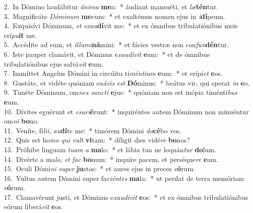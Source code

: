 {2.~}In Dómino laudábitur \textit{á}\textit{ni}\textit{ma} \textbf{me}a:~* áudiant mansuéti, et \textit{læ}\textbf{tén}tur.\\
{3.~}Magnificáte \textit{Dó}\textit{mi}\textit{num} \textbf{me}cum:~* et exaltémus nomen ejus in \textit{i}\textbf{dí}psum.\\
{4.~}Exquisívi Dóminum, \textit{et} \textit{e}\textit{xau}\textbf{dí}vit me:~* et ex ómnibus tribulatiónibus meis erí\textit{pu}\textbf{it} me.\\
{5.~}Accédite ad eum, et \textit{il}\textit{lu}\textit{mi}\textbf{ná}mini:~* et fácies vestræ non con\textit{fun}\textbf{dén}tur.\\
{6.~}Iste pauper clamávit, et Dóminus e\textit{xau}\textit{dí}\textit{vit} \textbf{e}um:~* et de ómnibus tribulatiónibus ejus salvá\textit{vit} \textbf{e}um.\\
{7.~}Immíttet Angelus Dómini in circúitu ti\textit{mén}\textit{ti}\textit{um} \textbf{e}um:~* et erípi\textit{et} \textbf{e}os.\\
{8.~}Gustáte, et vidéte quóniam su\textit{á}\textit{vis} \textit{est} \textbf{Dó}minus:~* beátus vir, qui sperat \textit{in} \textbf{e}o.\\
{9.~}Timéte Dóminum, om\textit{nes} \textit{san}\textit{cti} \textbf{e}jus:~* quóniam non est inópia timénti\textit{bus} \textbf{e}um.\\
{10.~}Dívites eguérunt et \textit{e}\textit{su}\textit{ri}\textbf{é}runt:~* inquiréntes autem Dóminum non minuéntur om\textit{ni} \textbf{bo}no.\\
{11.~}Veníte, fí\textit{li}\textit{i}, \textit{au}\textbf{dí}te me:~* timórem Dómini \textit{do}\textbf{cé}bo vos.\\
{12.~}Quis est ho\textit{mo} \textit{qui} \textit{vult} \textbf{vi}tam:~* díligit dies vidé\textit{re} \textbf{bo}nos?\\
{13.~}Próhibe linguam \textit{tu}\textit{am} \textit{a} \textbf{ma}lo:~* et lábia tua ne loquán\textit{tur} \textbf{do}lum.\\
{14.~}Divérte a ma\textit{lo}, \textit{et} \textit{fac} \textbf{bo}num:~* inquíre pacem, et perséque\textit{re} \textbf{e}am.\\
{15.~}Oculi Dómi\textit{ni} \textit{su}\textit{per} \textbf{ju}stos:~* et aures ejus in preces \textit{e}\textbf{ó}rum.\\
{16.~}Vultus autem Dómini super fa\textit{ci}\textit{én}\textit{tes} \textbf{ma}la:~* ut perdat de terra memóriam \textit{e}\textbf{ó}rum.\\
{17.~}Clamavérunt justi, et Dóminus e\textit{xau}\textit{dí}\textit{vit} \textbf{e}os:~* et ex ómnibus tribulatiónibus eórum liberá\textit{vit} \textbf{e}os.\\
